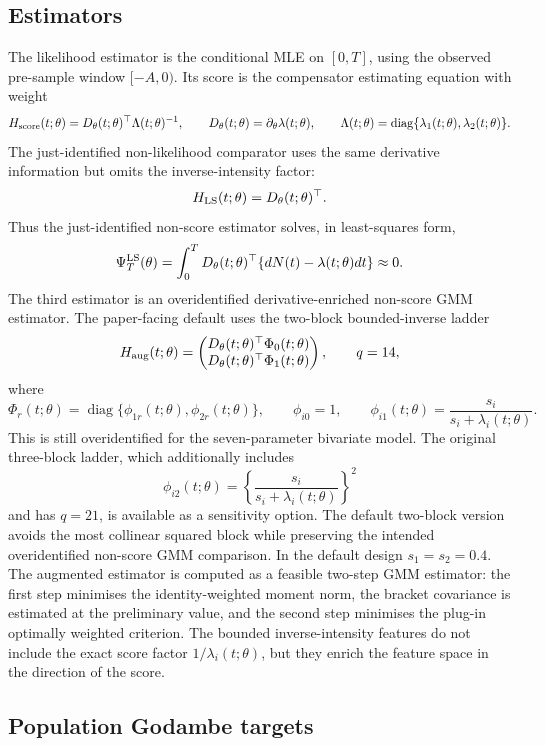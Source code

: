 \subsection{Estimators}

The likelihood estimator is the conditional MLE on $[0,T]$, using the observed pre-sample window $[-A,0)$.  Its score is the compensator estimating equation with weight
\[
    H_{\rm score}(t;\theta)
    =
    D_\theta(t;\theta)^\top\Lambda(t;\theta)^{-1},
    \qquad
    D_\theta(t;\theta)=\partial_\theta\lambda(t;\theta),
    \qquad
    \Lambda(t;\theta)=\operatorname{diag}\{\lambda_1(t;\theta),\lambda_2(t;\theta)\}.
\]
The just-identified non-likelihood comparator uses the same derivative information but omits the inverse-intensity factor:
\[
    H_{\rm LS}(t;\theta)=D_\theta(t;\theta)^\top.
\]
Thus the just-identified non-score estimator solves, in least-squares form,
\[
    \Psi_T^{\rm LS}(\theta)
    =
    \int_0^T D_\theta(t;\theta)^\top\{dN(t)-\lambda(t;\theta)dt\}
    \approx 0.
\]
The third estimator is an overidentified derivative-enriched non-score GMM estimator.  The paper-facing default uses the two-block bounded-inverse ladder
\[
H_{\rm aug}(t;\theta)=
\begin{pmatrix}
D_\theta(t;\theta)^\top \Phi_0(t;\theta)\\
D_\theta(t;\theta)^\top \Phi_1(t;\theta)
\end{pmatrix},
\qquad q=14,
\]
where
\[
\Phi_r(t;\theta)=\operatorname{diag}\{\phi_{1r}(t;\theta),\phi_{2r}(t;\theta)\},
\qquad
\phi_{i0}=1,
\qquad
\phi_{i1}(t;\theta)=\frac{s_i}{s_i+\lambda_i(t;\theta)}.
\]
This is still overidentified for the seven-parameter bivariate model.  The original three-block ladder, which additionally includes
\[
\phi_{i2}(t;\theta)=\left\{\frac{s_i}{s_i+\lambda_i(t;\theta)}\right\}^2
\]
and has $q=21$, is available as a sensitivity option.  The default two-block version avoids the most collinear squared block while preserving the intended overidentified non-score GMM comparison.  In the default design $s_1=s_2=0.4$.  The augmented estimator is computed as a feasible two-step GMM estimator: the first step minimises the identity-weighted moment norm, the bracket covariance is estimated at the preliminary value, and the second step minimises the plug-in optimally weighted criterion.  The bounded inverse-intensity features do not include the exact score factor $1/\lambda_i(t;\theta)$, but they enrich the feature space in the direction of the score.

\subsection{Population Godambe targets}

